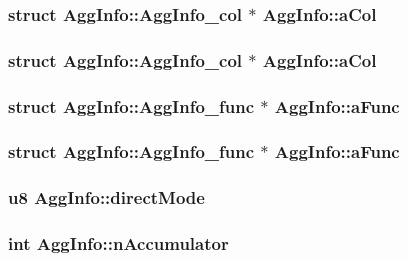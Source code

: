 \subsubsection{\setlength{\rightskip}{0pt plus 5cm}struct \bf{Agg\-Info::Agg\-Info\_\-col} $\ast$ \bf{Agg\-Info::a\-Col}}\label{structAggInfo_b081353244b661af7baa01d9400a9250}


\subsubsection{\setlength{\rightskip}{0pt plus 5cm}struct \bf{Agg\-Info::Agg\-Info\_\-col} $\ast$ \bf{Agg\-Info::a\-Col}}\label{structAggInfo_b081353244b661af7baa01d9400a9250}


\subsubsection{\setlength{\rightskip}{0pt plus 5cm}struct \bf{Agg\-Info::Agg\-Info\_\-func} $\ast$ \bf{Agg\-Info::a\-Func}}\label{structAggInfo_d195ff9d80f144a07c7d3c5952c1dc9d}


\subsubsection{\setlength{\rightskip}{0pt plus 5cm}struct \bf{Agg\-Info::Agg\-Info\_\-func} $\ast$ \bf{Agg\-Info::a\-Func}}\label{structAggInfo_d195ff9d80f144a07c7d3c5952c1dc9d}


\subsubsection{\setlength{\rightskip}{0pt plus 5cm}\bf{u8} \bf{Agg\-Info::direct\-Mode}}\label{structAggInfo_0cd109dc4868b7215d6b0fec77fba6e3}


\subsubsection{\setlength{\rightskip}{0pt plus 5cm}int \bf{Agg\-Info::n\-Accumulator}}\label{structAggInfo_824a520637bff9de79b3430f76753b8d}


